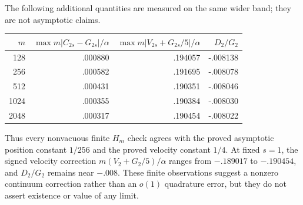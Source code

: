 The following additional quantities are measured on the same wider band;
they are not asymptotic claims.
\begin{center}
\begin{tabular}{@{}r|rrr@{}}
$m$ & $\max m|C_{2s}-G_{2s}|/\alpha$
& $\max m|V_{2s}+G_{2s}/5|/\alpha$ & $D_2/G_2$\\
\hline
128  & .000880 & .194057 & -.008138\\
256  & .000582 & .191695 & -.008078\\
512  & .000431 & .190351 & -.008046\\
1024 & .000355 & .190384 & -.008030\\
2048 & .000317 & .190454 & -.008022\\
\end{tabular}
\end{center}
Thus every nonvacuous finite $H_m$ check agrees with the proved asymptotic
position constant $1/256$ and the proved velocity constant $1/4$.
At fixed $s=1$, the signed velocity
correction $m(V_2+G_2/5)/\alpha$ ranges from $-.189017$ to $-.190454$, and
$D_2/G_2$ remains near $-.008$.  These finite observations suggest a
nonzero continuum correction rather than an $o(1)$ quadrature error, but they
do not assert existence or value of any limit.

